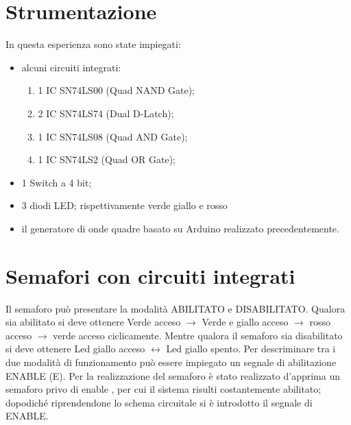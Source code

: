 \section{Strumentazione}
	In questa esperienza sono state impiegati:
	\begin{itemize}
		\item alcuni circuiti integrati:
		\begin{enumerate}
			\item 1 IC SN74LS00 (Quad NAND Gate);
			\item 2 IC SN74LS74 (Dual D-Latch);
			\item 1 IC SN74LS08 (Quad AND Gate);
			\item 1 IC SN74LS2 (Quad OR Gate);
		\end{enumerate}
		\item 1 Switch a 4 bit;
		\item 3 diodi LED; rispettivamente verde giallo e rosso
		\item il generatore di onde quadre basato su Arduino realizzato precedentemente.
	\end{itemize}
\section{Semafori con circuiti integrati }
Il semaforo può presentare la modalità ABILITATO e DISABILITATO. Qualora sia abilitato si deve
ottenere Verde acceso $\longrightarrow$ Verde e
giallo acceso $\longrightarrow$ rosso acceso $\longrightarrow$
verde acceso  ciclicamente. Mentre qualora il semaforo sia disabilitato si deve ottenere
Led giallo acceso $\leftrightarrow$ Led giallo spento.
Per descriminare tra i due modalità di funzionamento può essere impiegato un segnale di abilitazione
ENABLE (E).
Per la realizzazione del semaforo è stato realizzato d'apprima un semaforo privo di enable , per cui il sistema risulti costantemente abilitato;
dopodiché riprendendone lo schema circuitale si è introdotto il segnale di ENABLE.
